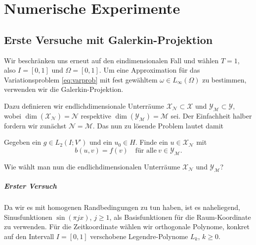
\chapter{Numerische Experimente} %
\label{cha:numerische_experimente}

\section{Erste Versuche mit Galerkin-Projektion} %
\label{sec:erste_versuche_mit_galerkin_projektion}

Wir beschränken uns erneut auf den eindimensionalen Fall und wählen $T = 1$, also $I = [0, 1]$ und $\Omega = [0 ,1]$.
Um eine Approximation für das Variationsproblem \eqref{eq:varprob} mit fest gewähltem $\omega \in L_{\infty}(\Omega)$ zu bestimmen, verwenden wir die Galerkin-Projektion.

Dazu definieren wir endlichdimensionale Unterräume $\mathcal X_{\mathcal N} \subset \mathcal X$ und $\mathcal Y_{\mathcal M} \subset \mathcal Y$, wobei $\dim(\mathcal X_{\mathcal N}) = \mathcal N$ respektive $\dim(\mathcal Y_{\mathcal M}) = \mathcal M$ sei.
Der Einfachheit halber fordern wir zunächst $\mathcal N = \mathcal M$.
Das nun zu lösende Problem lautet damit

\begin{Problem}
    Gegeben ein $g \in L_{2}(I; V')$ und ein $u_{0} \in H$. Finde ein $u \in \mathcal X_{\mathcal N}$ mit
    \begin{equation}
        \label{eq:varprob_3}
        b(u, v) = f(v) \quad \text{für alle}~v \in \mathcal Y_{\mathcal M}.
    \end{equation}
\end{Problem}

Wie wählt man nun die endlichdimensionalen Unterräume $\mathcal X_{\mathcal N}$ und $\mathcal Y_{\mathcal M}$?

\paragraph{Erster Versuch} %
\label{par:erster_versuch}

Da wir es mit homogenen Randbedingungen zu tun haben, ist es naheliegend, Sinusfunktionen $\sin(\pi j x)$, $j \geq 1$, als Basisfunktionen für die Raum-Koordinate zu verwenden.
Für die Zeitkoordinate wählen wir orthogonale Polynome, konkret auf den Intervall $I = [0, 1]$ verschobene Legendre-Polynome $L_{k}$, $k \geq 0$.

